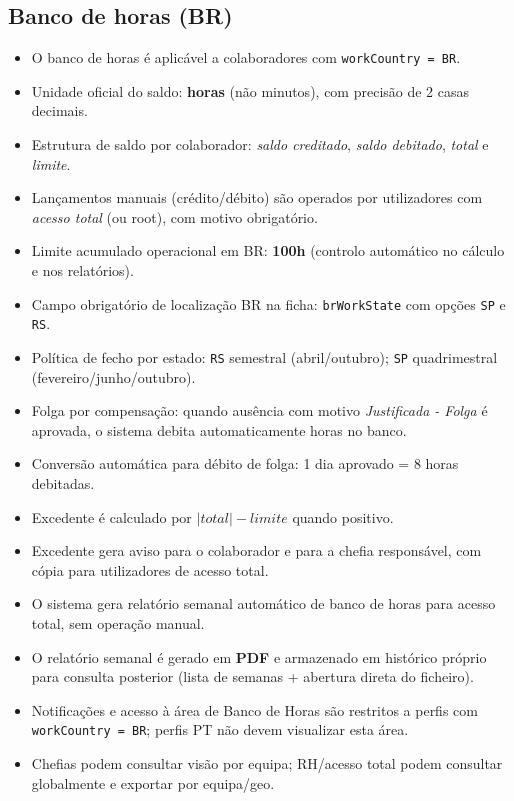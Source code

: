 \documentclass[11pt,a4paper,twoside]{article}
\begin{document}
\subsection{Banco de horas (BR)}
\begin{itemize}
  \item O banco de horas é aplicável a colaboradores com \texttt{workCountry = BR}.
  \item Unidade oficial do saldo: \textbf{horas} (não minutos), com precisão de 2 casas decimais.
  \item Estrutura de saldo por colaborador: \textit{saldo creditado}, \textit{saldo debitado}, \textit{total} e \textit{limite}.
  \item Lançamentos manuais (crédito/débito) são operados por utilizadores com \textit{acesso total} (ou root), com motivo obrigatório.
  \item Limite acumulado operacional em BR: \textbf{100h} (controlo automático no cálculo e nos relatórios).
  \item Campo obrigatório de localização BR na ficha: \texttt{brWorkState} com opções \texttt{SP} e \texttt{RS}.
  \item Política de fecho por estado: \texttt{RS} semestral (abril/outubro); \texttt{SP} quadrimestral (fevereiro/junho/outubro).
  \item Folga por compensação: quando ausência com motivo \textit{Justificada - Folga} é aprovada, o sistema debita automaticamente horas no banco.
  \item Conversão automática para débito de folga: 1 dia aprovado = 8 horas debitadas.
  \item Excedente é calculado por \( |total| - limite \) quando positivo.
  \item Excedente gera aviso para o colaborador e para a chefia responsável, com cópia para utilizadores de acesso total.
  \item O sistema gera relatório semanal automático de banco de horas para acesso total, sem operação manual.
  \item O relatório semanal é gerado em \textbf{PDF} e armazenado em histórico próprio para consulta posterior (lista de semanas + abertura direta do ficheiro).
  \item Notificações e acesso à área de Banco de Horas são restritos a perfis com \texttt{workCountry = BR}; perfis PT não devem visualizar esta área.
  \item Chefias podem consultar visão por equipa; RH/acesso total podem consultar globalmente e exportar por equipa/geo.
\end{itemize}
\end{document}

